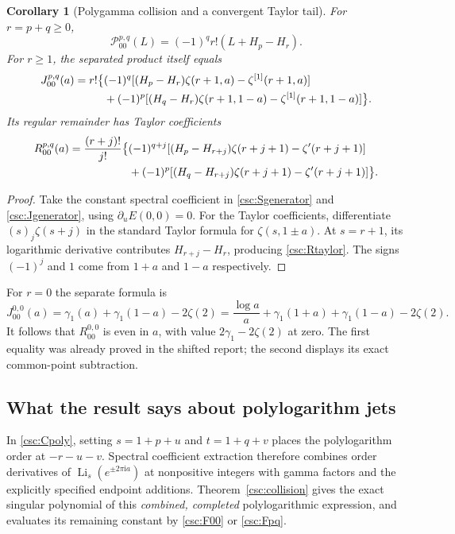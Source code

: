 \documentclass[11pt,a4paper]{article}
\numberwithin{equation}{section}
\newtheorem{corollary}[theorem]{Corollary}
\theoremstyle{definition}
\newcommand{\ii}{\mathrm i}
\newcommand{\Li}{\operatorname{Li}}
\begin{document}
\begin{corollary}[Polygamma collision and a convergent Taylor tail]\label{csc:collisionpsi}
For $r=p+q\ge0$,
\begin{equation}\label{csc:Ppsi}
\mathcal P_{00}^{p,q}(L)=(-1)^qr!\left(L+H_p-H_r\right).
\end{equation}
For $r\ge1$, the separated product itself equals
\begin{align}
J_{00}^{p,q}(a)=r!\big\{&(-1)^q[(H_p-H_r)\zeta(r+1,a)-\zeta^{[1]}(r+1,a)]\notag\\
&+(-1)^p[(H_q-H_r)\zeta(r+1,1-a)-\zeta^{[1]}(r+1,1-a)]\big\}.\label{csc:Jpsi}
\end{align}
Its regular remainder has Taylor coefficients
\begin{align}
[a^j]R_{00}^{p,q}(a)=\frac{(r+j)!}{j!}\big\{&
(-1)^{q+j}[(H_p-H_{r+j})\zeta(r+j+1)-\zeta'(r+j+1)]\notag\\
&+(-1)^p[(H_q-H_{r+j})\zeta(r+j+1)-\zeta'(r+j+1)]\big\}.\label{csc:Rtaylor}
\end{align}
\end{corollary}
\begin{proof}
Take the constant spectral coefficient in \eqref{csc:Sgenerator} and \eqref{csc:Jgenerator}, using $\partial_uE(0,0)=0$. For the Taylor coefficients, differentiate
$(s)_j\zeta(s+j)$ in the standard Taylor formula for $\zeta(s,1\pm a)$. At $s=r+1$, its logarithmic derivative contributes
$H_{r+j}-H_r$, producing \eqref{csc:Rtaylor}. The signs $(-1)^j$ and $1$ come from $1+a$ and $1-a$ respectively.
\end{proof}
For $r=0$ the separate formula is
\begin{equation}\label{csc:Jbase}
J_{00}^{0,0}(a)=\gamma_1(a)+\gamma_1(1-a)-2\zeta(2)
=\frac{\log a}{a}+\gamma_1(1+a)+\gamma_1(1-a)-2\zeta(2).
\end{equation}
It follows that $R_{00}^{0,0}$ is even in $a$, with value $2\gamma_1-2\zeta(2)$ at zero. The first equality was already proved in the shifted report; the second displays its exact common-point subtraction.

\subsection{What the result says about polylogarithm jets}
In \eqref{csc:Cpoly}, setting $s=1+p+u$ and $t=1+q+v$ places the polylogarithm order at $-r-u-v$. Spectral coefficient extraction therefore combines order derivatives of $\Li_s(e^{\pm2\pi\ii a})$ at nonpositive integers with gamma factors and the explicitly specified endpoint additions. Theorem~\ref{csc:collision} gives the exact singular polynomial of this \emph{combined, completed} polylogarithmic expression, and evaluates its remaining constant by \eqref{csc:F00} or \eqref{csc:Fpq}.
\end{document}
